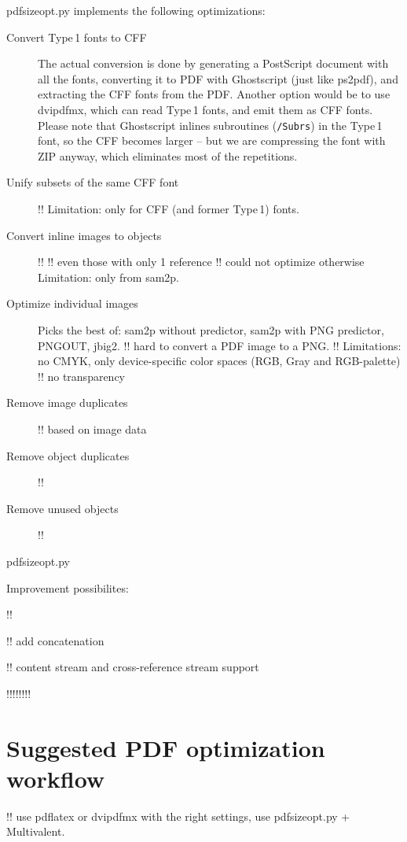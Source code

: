 \documentclass{ltugproc}
\def\cmd{\textsf}
\begin{document}
\cmd{pdfsizeopt.py} implements the following optimizations:

\begin{description}

\item[Convert Type\,1 fonts to CFF]
The actual conversion is done by generating a PostScript document with all
the fonts, converting it to PDF with Ghostscript (just like \cmd{ps2pdf}),
and extracting the CFF fonts from the PDF. Another option would be to use
\cmd{dvipdfmx}, which can read Type\,1 fonts, and emit them as CFF fonts.
Please note that Ghostscript inlines subroutines (\texttt{/Subrs}) in the
Type\,1 font, so the CFF becomes larger -- but we are compressing the font
with ZIP anyway, which eliminates most of the repetitions.

\item[Unify subsets of the same CFF font]
!!
Limitation: only for CFF (and former Type\,1) fonts.

\item[Convert inline images to objects]
!!
!! even those with only 1 reference
!! could not optimize otherwise
Limitation: only from sam2p.

\item[Optimize individual images]
Picks the best of: \cmd{sam2p} without predictor, \cmd{sam2p} with
PNG predictor, PNGOUT, \cmd{jbig2}.
!! hard to convert a PDF image to a PNG.
!! Limitations: no CMYK, only device-specific color spaces (RGB, Gray and
   RGB-palette)
!! no transparency

\item[Remove image duplicates]
!! based on image data

\item[Remove object duplicates]
!!

\item[Remove unused objects]
!!

\end{description}

\cmd{pdfsizeopt.py}



Improvement possibilites:

!! 

!! add concatenation

!! content stream and cross-reference stream support

!!!!!!!!

\section{Suggested PDF optimization workflow}\label{workflow}
!! use pdflatex or dvipdfmx with the right settings, use pdfsizeopt.py +
   Multivalent.
\end{document}
